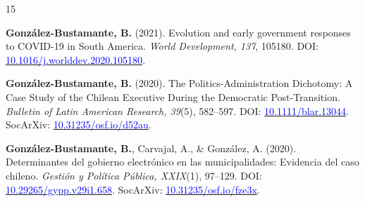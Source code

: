 \begin{publications}
\begin{benumerate}{15}
\item{{\bfseries González-Bustamante, B.} (2021). Evolution and early government responses to COVID-19 in South America. {\itshape World Development, 137}, 105180. DOI: \href{https://doi.org/10.1016/j.worlddev.2020.105180}{\textcolor{blue}{10.1016/j.worlddev.2020.105180}}.}\vspace{1mm}

\item{{\bfseries González-Bustamante, B.} (2020). The Politics-Administration Dichotomy: A Case Study of the Chilean Executive During the Democratic Post-Transition. {\itshape Bulletin of Latin American Research, 39}(5), 582--597. DOI: \href{https://doi.org/10.1111/blar.13044}{\textcolor{blue}{10.1111/blar.13044}}. SocArXiv: \href{https://doi.org/10.31235/osf.io/d52au}{\textcolor{blue}{10.31235/osf.io/d52au}}.}\vspace{1mm}


\item{{\bfseries González-Bustamante, B.}, Carvajal, A., \& González, A. (2020). Determinantes del gobierno electrónico en las municipalidades: Evidencia del caso chileno. {\itshape Gestión y Política Pública, XXIX}(1), 97--129. DOI: \\ \href{http://dx.doi.org/10.29265/gypp.v29i1.658}{\textcolor{blue}{10.29265/gypp.v29i1.658}}. SocArXiv: \href{https://doi.org/10.31235/osf.io/fze3x}{\textcolor{blue}{10.31235/osf.io/fze3x}}.} \vspace{1mm}



\end{benumerate}
\end{publications}

